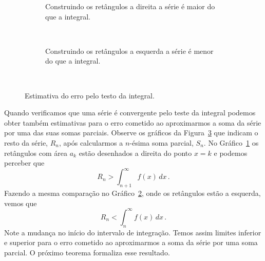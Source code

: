 \begin{figure}
  \centering
  \begin{subfigure}{\linewidth}
    \centering
    \vspace{5mm}
    
    \caption{Construindo os retângulos a direita a série é maior do que a integral.}
    \label{fig:teste_integral_erro_right}
  \end{subfigure}\\[2mm]
  \begin{subfigure}{\linewidth}
    \centering
    
    \caption{Construindo os retângulos a esquerda a série é menor do que a integral.}
    \label{fig:teste_integral_erro_left}
  \end{subfigure}\\
  \caption{Estimativa do erro pelo testo da integral.}
  \label{fig:teste_integral_erro}
\end{figure}

Quando verificamos que uma série é convergente pelo teste da integral
podemos obter também estimativas para o erro cometido ao aproximarmos
a soma da série por uma das suas somas parciais.
Observe os gráficos da Figura~\ref{fig:teste_integral_erro} que
indicam o resto da série, $R_n$, após calcularmos a $n$-ésima soma parcial, $S_n$.
No Gráfico~\ref{fig:teste_integral_erro_right} os retângulos com área $a_k$
estão desenhados a direita do ponto $x=k$ e podemos perceber que
\[
  R_n > \int_{n+1}^{\infty} f(x)\,dx          \,.
\]
Fazendo a mesma comparação no Gráfico~\ref{fig:teste_integral_erro_left},
onde os retângulos estão a esquerda, vemos que
\[
  R_n < \int_{n}^{\infty} f(x)\,dx         \,.
\]
Note a mudança no início do intervalo de integração.
Temos assim limites inferior e superior para o erro cometido
ao aproximarmos a soma da série por uma soma parcial.
O próximo teorema formaliza esse resultado.

